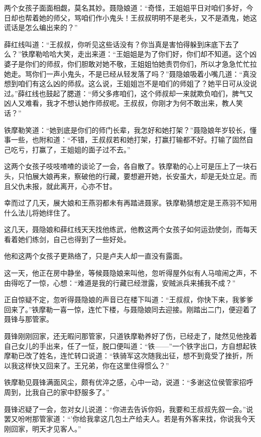 \documentclass[12pt,oneside]{book}
\begin{document}
两个女孩子面面相觑，莫名其妙。聂隐娘道：``奇怪，王姐姐平日对咱们多好，今日却也帮着她的师父，骂咱们作小鬼头！王叔叔明明不是老头，又不是酒鬼，她这谎话是怎么编出来的？''

薛红线叫道：``王叔叔，你听见这些话没有？你当真是害怕得躲到床底下去了么？''铁摩勒哈哈大笑，走出来道：``王姐姐是为了你们好，你们却不知道。这个凶婆子是你们的师叔，你们胆敢对她不敬，王姐姐怕她责罚你们，所以才急急忙忙拉她走。骂你们一声小鬼头，不是已经从轻发落了吗？''聂隐娘吸着小嘴几道：``真没想到咱们有这么凶的师叔。这么说，王姐姐岂不是咱们的师姐了？她平日可从没说过。''薛红线也鼓起了腮道：``师父多疼咱们，这个师叔却一来就欺负咱们，脾气又凶人又难看，我才不想认她作师叔呢。王叔叔，你刚才为何不敢出来，教人笑话？''

铁摩勒笑道：``她到底是你们的师门长辈，我怎好和她打架？''聂隐娘年岁较长，懂事一些，也附和道：``不错，王叔叔若和她打架，打赢打输都不好。打输了固然自己吃亏，打赢了，王姐姐的面子过不去。''

这两个女孩子吱吱喳喳的谈论了一会，各自散了。铁摩勒的心上可是压上了一块石头，只怕展大娘再来，察破他的行藏，要想避开她，长安虽大，却是无处立足。而且父仇未报，就此离开，心亦不甘。

幸而过了几天，展大娘和王燕羽都未有再踏进聂家。铁摩勒猜想定是王燕羽不知用什么法儿将她绊住了。

这几天，聂隐娘和薛红线天天找他练武，他教这两个女孩子如何运劲使剑，而每天看着她们练剑，自己也得到了一些好处。

他和这两个女孩子更熟络了，只是卢夫人却一直没有露面。

这一天，他正在房中静坐，等候聂隐娘来叫他，忽听得屋外似有人马喧闹之声，不由得吃了一惊，心想：``难道是我的行藏已经泄露，安贼派兵来捕我不成？''

正自惊疑不定，忽听得聂隐娘的声音已在楼下叫道：``王叔叔，你快下来，我爹爹回来了。''铁摩勒一喜一惊，连忙下楼，与聂隐娘同去迎接。刚踏出二门，便迎着了聂锋与那管家。

聂锋刚刚回家，还无暇问那管家，只道铁摩勒养好了伤，已经走了，陡然见他挽着自己女儿的手出来，任了一怔，脱口便叫道：``铁------''一个铁字出口，方自想起铁摩勒已改了姓名，连忙转口说道：``铁骑军这次随我出征，想不到竟受了挫折，所以我这样快又回来了。王兄弟，你在这里住得惯么？''

铁摩勒见聂锋满面风尘，颇有优淬之感，心中一动，说道：``多谢这位侯管家招呼周到，比我自己的家中舒服多了。''

聂锋迟疑了一会，忽对女儿说道：``你进去告诉你妈，我要和王叔叔先叙一会。''说罢又吩咐那管家道：``'你给我拿这几包土产给夫人。若是有外客来找，你说我今天刚回家，明天才见客人。''
\end{document}
